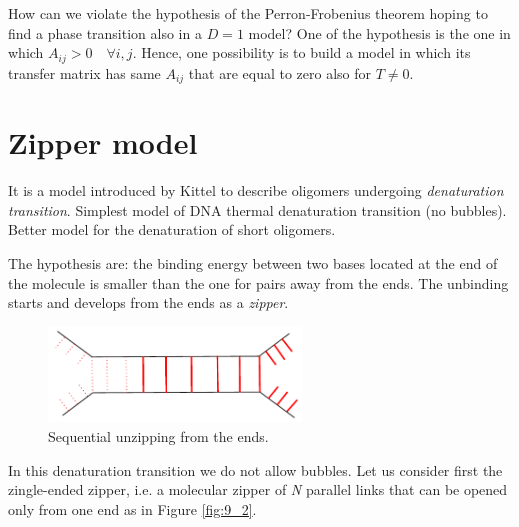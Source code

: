 \documentclass[../main/main.tex]{subfiles}
\begin{document}

How can we violate the hypothesis of the Perron-Frobenius theorem hoping to find a phase transition also in a \( D=1 \) model? One of the hypothesis is the one in which \( A_{ij}>0 \quad \forall i,j \). Hence, one possibility is to build a model in which its transfer matrix has same \( A_{ij} \) that are equal to zero also for \( T \neq 0 \).

\section{Zipper model}
It is a model introduced by Kittel to describe oligomers undergoing \emph{denaturation transition}.
Simplest model of DNA thermal denaturation transition (no bubbles). Better model for the denaturation of short oligomers.

The hypothesis are: the binding energy between two bases located at the end of the molecule is smaller than the one for pairs away from the ends. The unbinding starts and develops from the ends as a \emph{zipper}.
\begin{figure}[h!]
\centering
\includegraphics[width=0.6\textwidth]{../lessons/9_image/1.pdf}
\caption{\label{fig:9_1} Sequential unzipping from the ends.}
\end{figure}

In this denaturation transition we do not allow bubbles.
Let us consider first the zingle-ended zipper, i.e. a molecular zipper of \emph{N} parallel links that can be opened only from one end as in Figure \ref{fig:9_2}.
\end{document}
